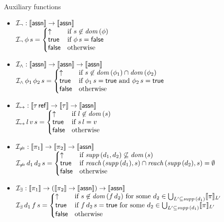 \documentclass[12pt,a4paper]{report}
\newcommand{\I}{\mathcal{I}}
\begin{document}
\noindent Auxiliary functions
\begin{itemize}
  \item $\I_\neg: \semantic{\tassn} \to \semantic{\tassn}$ \\[1ex]
        $\I_\neg\,\phi\,s =
          \bcase
            \uparrow  & \text{if } s \not\in \dom{\phi} \\
            \true     & \text{if } \phi\,s=\false \\
            \false    & \text{otherwise}
          \ecase$

  \item $\I_\wedge: \semantic{\tassn} \to \semantic{\tassn} \to \semantic{\tassn}$ \\[1ex]
        $\I_\wedge\,\phi_1\,\phi_2\,s =
          \bcase
            \uparrow  & \text{if } s \not\in \dom{\phi_1} \cap \dom{\phi_2} \\
            \true     & \text{if } \phi_1\,s=\true \text{ and } \phi_2\,s=\true \\
            \false    & \text{otherwise}
          \ecase$

  \item $\I_{\mapsto}: \semantic{\tref{\tau}} \to \semantic{\tau} \to \semantic{\tassn}$ \\[1ex]
        $\I_{\mapsto}\,l\,v\,s =
          \bcase
            \uparrow  & \text{if } l \not\in \dom{s} \\
            \true     & \text{if } s\,l = v \\
            \false    & \text{otherwise}
          \ecase$

  \item $\I_{\not\rightleftharpoons}: \semantic{\pi_1} \to \semantic{\pi_2} \to \semantic{\tassn}$ \\[1ex]
        $\I_{\not\rightleftharpoons}\,d_1\,d_2\,s =
          \bcase
            \uparrow  & \text{if } \supp{d_1,d_2} \not\subseteq \dom{s} \\
            \true     & \text{if } \reach{\supp{d_1}}{s} \cap \reach{\supp{d_2}}{s} = \emptyset \\
            \false    & \text{otherwise}
          \ecase$
  
  \item $\I_\exists: \semantic{\pi_1} \to (\semantic{\pi_2} \to \semantic{\tassn}) \to \semantic{\tassn}$ \\[1ex]
        $\I_\exists\,d_1\,f\,s =
          \bcase
            \uparrow  & \text{if } s \not\in \dom{f\,d_2}
                        \text{ for some }d_2 \in \bigcup_{L'\subseteq\supp{d_1}}\semantic{\pi}_{L'} \\
            \true     & \text{if } f\,d_2\,s = \true
                        \text{ for some } d_2 \in \bigcup_{L'\subseteq\supp{d_1}}\semantic{\pi}_{L'} \\
            \false    & \text{otherwise}
          \ecase$
\end{itemize}
\end{document}
